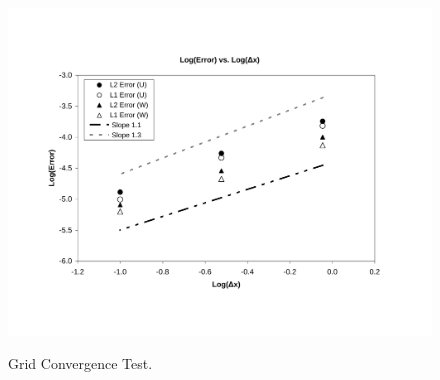 \begin{figure}[h]
\vspace{0.8in}
\begin{center}
\includegraphics[width=5.4in]{../figures/GridConvTest/GridConvTest_dt0p01.pdf}
\label{fig:GridConvTest_dt0p01}
\vspace{-0.2in}
\caption{Grid Convergence Test.}
\end{center}
\end{figure}

\cp







